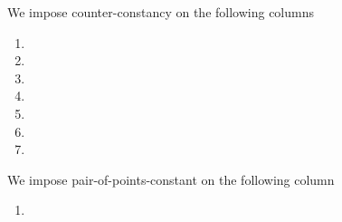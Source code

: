 We impose counter-constancy on the following columns
\begin{multicols}{3}
    \begin{enumerate}
        \item \maxCt
        \item \isInfinity
        \item \accPairings
        \item \trivialPairing
        \item \membershipTestRequired{}
        \item \notOnGTwo{}
        \item \notOnGTwoAcc{}
    \end{enumerate}
\end{multicols}
We impose pair-of-points-constant on the following column
\begin{multicols}{3}
    \begin{enumerate}
        \item \acceptablePairOfPoints{}
    \end{enumerate}
\end{multicols}
